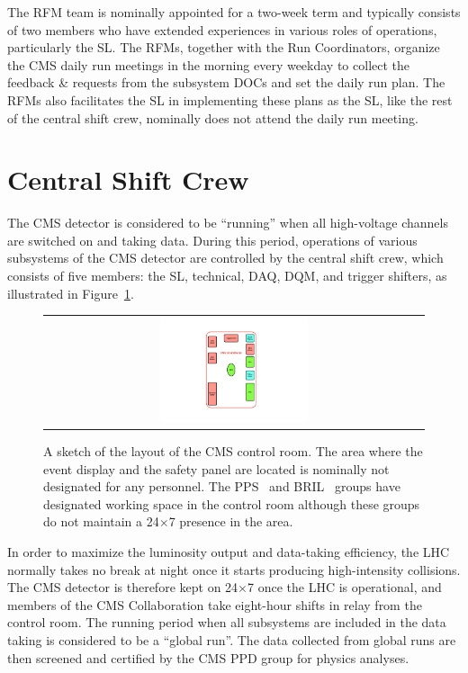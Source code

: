 The \ac{RFM} team is nominally appointed for a two-week term and typically consists of two members who have extended experiences in various roles of operations, particularly the \ac{SL}. The \acp{RFM}, together with the Run Coordinators, organize the \ac{CMS} daily run meetings in the morning every weekday to collect the feedback \& requests from the subsystem \acp{DOC} and set the daily run plan. The \acp{RFM} also facilitates the \ac{SL} in implementing these plans as the \ac{SL}, like the rest of the central shift crew, nominally does not attend the daily run meeting.

\section{Central Shift Crew}
\label{sec:ControlRoom}

The \ac{CMS} detector is considered to be ``running'' when all high-voltage channels are switched on and taking data. During this period, operations of various subsystems of the \ac{CMS} detector are controlled by the central shift crew, which consists of five members: the \ac{SL}, technical, \ac{DAQ}, \ac{DQM}, and trigger shifters, as illustrated in Figure~\ref{fig:ControlRoom}. 

\begin{figure}[tbh!]
 \begin{center}
 \begin{tabular}{c}
 \includegraphics[width=0.4\textwidth]{figures/Part2/Operation/ControlRoom}
 \end{tabular}
 \caption{A sketch of the layout of the \ac{CMS} control room. The area where the event display and the safety panel are located is nominally not designated for any personnel. The \ac{PPS}~\cite{CMS:2014sdw} and \ac{BRIL}~\cite{CMS:2008xjf} groups have designated working space in the control room although these groups do not maintain a 24$\times$7 presence in the area.}
 \label{fig:ControlRoom}
 \end{center}
\end{figure}

In order to maximize the luminosity output and data-taking efficiency, the \ac{LHC} normally takes no break at night once it starts producing high-intensity collisions. The \ac{CMS} detector is therefore kept on 24$\times$7 once the \ac{LHC} is operational, and members of the \ac{CMS} Collaboration take eight-hour shifts in relay from the control room. The running period when all subsystems are included in the data taking is considered to be a ``global run''. The data collected from global runs are then screened and certified by the \ac{CMS} \ac{PPD} group for physics analyses. 


